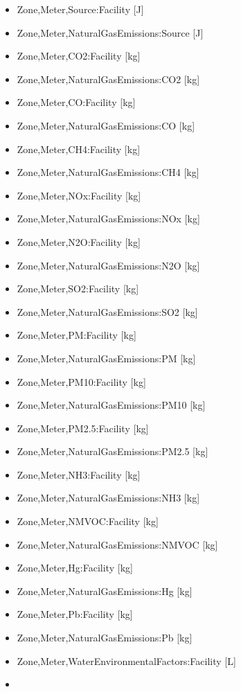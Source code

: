 \begin{itemize}
\item
  Zone,Meter,Source:Facility {[}J{]}
\item
  Zone,Meter,NaturalGasEmissions:Source {[}J{]}
\item
  Zone,Meter,CO2:Facility {[}kg{]}
\item
  Zone,Meter,NaturalGasEmissions:CO2 {[}kg{]}
\item
  Zone,Meter,CO:Facility {[}kg{]}
\item
  Zone,Meter,NaturalGasEmissions:CO {[}kg{]}
\item
  Zone,Meter,CH4:Facility {[}kg{]}
\item
  Zone,Meter,NaturalGasEmissions:CH4 {[}kg{]}
\item
  Zone,Meter,NOx:Facility {[}kg{]}
\item
  Zone,Meter,NaturalGasEmissions:NOx {[}kg{]}
\item
  Zone,Meter,N2O:Facility {[}kg{]}
\item
  Zone,Meter,NaturalGasEmissions:N2O {[}kg{]}
\item
  Zone,Meter,SO2:Facility {[}kg{]}
\item
  Zone,Meter,NaturalGasEmissions:SO2 {[}kg{]}
\item
  Zone,Meter,PM:Facility {[}kg{]}
\item
  Zone,Meter,NaturalGasEmissions:PM {[}kg{]}
\item
  Zone,Meter,PM10:Facility {[}kg{]}
\item
  Zone,Meter,NaturalGasEmissions:PM10 {[}kg{]}
\item
  Zone,Meter,PM2.5:Facility {[}kg{]}
\item
  Zone,Meter,NaturalGasEmissions:PM2.5 {[}kg{]}
\item
  Zone,Meter,NH3:Facility {[}kg{]}
\item
  Zone,Meter,NaturalGasEmissions:NH3 {[}kg{]}
\item
  Zone,Meter,NMVOC:Facility {[}kg{]}
\item
  Zone,Meter,NaturalGasEmissions:NMVOC {[}kg{]}
\item
  Zone,Meter,Hg:Facility {[}kg{]}
\item
  Zone,Meter,NaturalGasEmissions:Hg {[}kg{]}
\item
  Zone,Meter,Pb:Facility {[}kg{]}
\item
  Zone,Meter,NaturalGasEmissions:Pb {[}kg{]}
\item
  Zone,Meter,WaterEnvironmentalFactors:Facility {[}L{]}
\item

\end{itemize}
